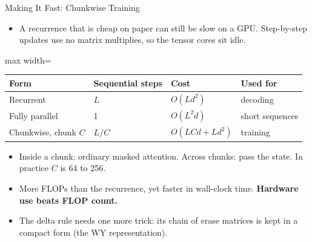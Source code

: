\begin{frame}{Making It Fast: Chunkwise Training}
    \begin{itemize}\itemsep0.3em
        \item A recurrence that is cheap on paper can still be slow on a GPU. Step-by-step updates use no matrix multiplies, so the tensor cores sit idle.
    \end{itemize}
    \vspace{0.2em}
    \begin{center}
    \small
    \begin{adjustbox}{max width=\linewidth}\begin{tabular}{llll}
        \toprule
        \textbf{Form} & \textbf{Sequential steps} & \textbf{Cost} & \textbf{Used for} \\
        \midrule
        Recurrent & $L$ & $O(Ld^2)$ & decoding \\
        Fully parallel & 1 & $O(L^2 d)$ & short sequences \\
        \rowcolor{KAUSTcyan!12} Chunkwise, chunk $C$ & $L/C$ & $O(LCd + Ld^2)$ & training \\
        \bottomrule
    \end{tabular}\end{adjustbox}
    \end{center}
    \vspace{0.2em}
    \begin{itemize}\itemsep0.4em
        \item Inside a chunk: ordinary masked attention. Across chunks: pass the state. In practice $C$ is 64 to 256.
        \item More FLOPs than the recurrence, yet faster in wall-clock time. \textbf{Hardware use beats FLOP count.}
        \item The delta rule needs one more trick: its chain of erase matrices is kept in a compact form (the WY representation).
    \end{itemize}
\end{frame}
